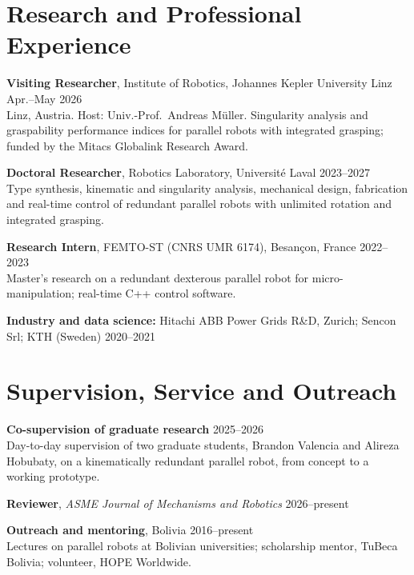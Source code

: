 \documentclass[11pt,letterpaper]{article}
\newenvironment{items}{\begin{list}{}{%
  \setlength{\leftmargin}{1.4em}\setlength{\itemindent}{-0.4em}
  \setlength{\itemsep}{0.5pt}\setlength{\parsep}{0pt}\setlength{\topsep}{1pt}}}%
  {\end{list}}
\newcommand{\dateline}[1]{\hfill{\footnotesize\color{cap} #1}}
\newcommand{\venue}[1]{\emph{#1}}
\begin{document}
\section{Research and Professional Experience}
\begin{items}
\item[] \textbf{Visiting Researcher}, Institute of Robotics, Johannes Kepler University Linz \dateline{Apr.--May 2026}\\
{\footnotesize Linz, Austria. Host: Univ.-Prof.~Andreas M\"uller. Singularity analysis and graspability performance
indices for parallel robots with integrated grasping; funded by the Mitacs Globalink Research Award.}
\item[] \textbf{Doctoral Researcher}, Robotics Laboratory, Universit\'e Laval \dateline{2023--2027}\\
{\footnotesize Type synthesis, kinematic and singularity analysis, mechanical design, fabrication and real-time control
of redundant parallel robots with unlimited rotation and integrated grasping.}
\item[] \textbf{Research Intern}, FEMTO-ST (CNRS UMR 6174), Besan\c{c}on, France \dateline{2022--2023}\\
{\footnotesize Master's research on a redundant dexterous parallel robot for micro-manipulation; real-time C++ control software.}
\item[] \textbf{Industry and data science:} {\footnotesize Hitachi ABB Power Grids R\&D, Zurich; Sencon Srl; KTH (Sweden)} \dateline{2020--2021}
\end{items}

\section{Supervision, Service and Outreach}
\begin{items}
\item[] \textbf{Co-supervision of graduate research} \dateline{2025--2026}\\
{\footnotesize Day-to-day supervision of two graduate students, Brandon Valencia and Alireza Hobubaty, on a kinematically redundant parallel robot, from concept to a working prototype.}
\item[] \textbf{Reviewer}, \venue{ASME Journal of Mechanisms and Robotics} \dateline{2026--present}
\item[] \textbf{Outreach and mentoring}, Bolivia \dateline{2016--present}\\
{\footnotesize Lectures on parallel robots at Bolivian universities; scholarship mentor, TuBeca Bolivia; volunteer, HOPE Worldwide.}
\end{items}
\end{document}
